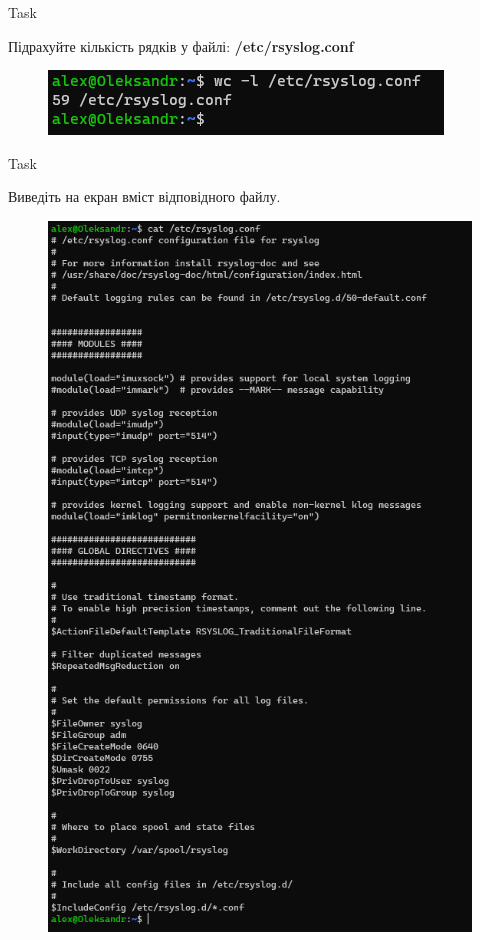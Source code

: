 \documentclass[a4paper,12pt]{article}
\newcommand{\RomanNumeralCaps}[1]{\MakeUppercase{\romannumeral #1}}
\begin{document}
    \begin{center}
        \Large{Task \RomanNumeralCaps{4}}
    \end{center}
    Підрахуйте кількість рядків у файлі: \textbf{/etc/rsyslog.conf}
    \begin{figure}[h!]
        \begin{minipage}[h]{1\linewidth}
            \centering
            \includegraphics[width=0.7\linewidth]{Prt sc/Figure_4.png}  
        \end{minipage}
    \end{figure}

\newpage
    \begin{center}
        \Large{Task \RomanNumeralCaps{5}}
    \end{center}
    Виведіть на екран вміст відповідного файлу.
    \begin{figure}[h!]
        \begin{minipage}[h]{1\linewidth}
            \centering
            \includegraphics[width=0.7\linewidth]{Prt sc/Figure_5.png}  
        \end{minipage}
    \end{figure}
\end{document}
